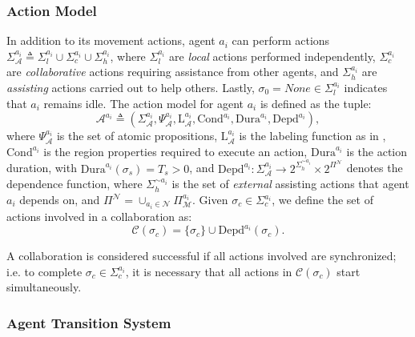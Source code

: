 \subsubsection{Action Model}\label{subsec:action-model}
In addition to its movement actions, agent $a_i$ can perform actions  $\Sigma^{a_i}_{\mathscr{A}} \triangleq \Sigma^{a_i}_l \cup \Sigma^{a_i}_c \cup \Sigma^{a_i}_h$, where $\Sigma^{a_i}_l$ are \textit{local} actions performed independently, $\Sigma^{a_i}_c$ are \textit{collaborative} actions requiring assistance from other agents, and $\Sigma^{a_i}_h$ are \textit{assisting} actions carried out to help others. Lastly, $\sigma_0 = \mathit{None}\in \Sigma^{a_i}_l$ indicates that $a_i$ remains idle. The action model for agent $a_i$ is defined as the tuple:
\begin{equation}\label{eq:action-model}
\mathscr{A}^{a_i} \triangleq \left(\Sigma^{a_i}_{\mathscr{A}}, \Psi^{a_i}_{\mathscr{A}}, \mathrm{L}^{a_i}_{\mathscr{A}}, \mathrm{Cond}^{a_i}, \mathrm{Dura}^{a_i}, \mathrm{Depd}^{a_i}\right),
\end{equation}
where $\Psi^{a_i}_{\mathscr{A}}$ is the set of atomic propositions, $\mathrm{L}^{a_i}_{\mathscr{A}}$ is the labeling function as in \cite{meng_paper}, $\mathrm{Cond}^{a_i}$ is the region properties required to execute an action, $\mathrm{Dura}^{a_i}$ is the action duration, with $\mathrm{Dura}^{a_i}(\sigma_s) = T_s > 0$, and 
$\mathrm{Depd}^{a_i}: \Sigma^{a_i}_{\mathscr{A}} \rightarrow 2^{\Sigma^{\sim a_i}_h} \times 2^{\Pi^{\mathcal{N}}}$ denotes the dependence function, where  $\Sigma^{\sim a_i}_h$ is the set of \textit{external} assisting actions that agent $a_i$ depends on, and $\Pi^{\mathcal{N}}=\cup_{a_i\in\mathcal{N}}\Pi^{a_i}_{\mathcal{M}}$. Given $\sigma_c\in \Sigma^{a_i}_c $, we define the set of actions involved in a collaboration as:
\begin{equation}\label{eq:collaboration}
    \mathcal{C}(\sigma_c)=\{\sigma_c\}\cup\mathrm{Depd}^{a_i}(\sigma_c).
\end{equation}
\begin{definition}\label{def:succesful-collab}
    A collaboration is considered successful if all actions involved are synchronized; i.e. to complete $\sigma_c \in \Sigma_c^{a_i}$, it is necessary that all actions in $\mathcal{C}(\sigma_c)$ start simultaneously.
\end{definition}
\subsubsection{Agent Transition System} \label{subsec:agent-ts}

